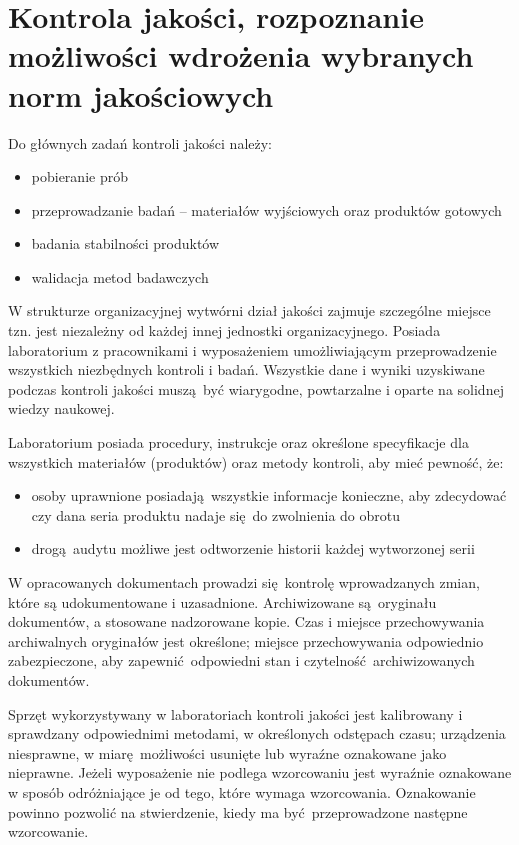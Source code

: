 \section{Kontrola jakości, rozpoznanie możliwości wdrożenia wybranych norm jakościowych}

Do głównych zadań kontroli jakości należy:
\begin{itemize}
	\item pobieranie prób
	\item przeprowadzanie badań -- materiałów wyjściowych oraz produktów gotowych
	\item badania stabilności produktów
	\item walidacja metod badawczych
\end{itemize}\vspace{\baselineskip}

W strukturze organizacyjnej wytwórni dział jakości zajmuje szczególne miejsce tzn. jest niezależny od każdej innej jednostki organizacyjnego. Posiada laboratorium z pracownikami i wyposażeniem umożliwiającym przeprowadzenie wszystkich niezbędnych kontroli i badań. Wszystkie dane i wyniki uzyskiwane podczas kontroli jakości muszą być wiarygodne, powtarzalne i oparte na solidnej wiedzy naukowej.\vspace{\baselineskip}

Laboratorium posiada procedury, instrukcje oraz określone specyfikacje dla wszystkich materiałów (produktów) oraz metody kontroli, aby mieć pewność, że:
\begin{itemize}
	\item osoby uprawnione posiadają wszystkie informacje konieczne, aby zdecydować czy dana seria produktu nadaje się do zwolnienia do obrotu
	\item drogą audytu możliwe jest odtworzenie historii każdej wytworzonej serii
\end{itemize}\vspace{\baselineskip}

W opracowanych dokumentach prowadzi się kontrolę wprowadzanych zmian, które są udokumentowane i uzasadnione. Archiwizowane są oryginału dokumentów, a stosowane nadzorowane kopie. Czas i miejsce przechowywania archiwalnych oryginałów jest określone; miejsce przechowywania odpowiednio zabezpieczone, aby zapewnić odpowiedni stan i czytelność archiwizowanych dokumentów.

Sprzęt wykorzystywany w laboratoriach kontroli jakości jest kalibrowany i sprawdzany odpowiednimi metodami, w określonych odstępach czasu; urządzenia niesprawne, w miarę możliwości usunięte lub wyraźne oznakowane jako nieprawne. Jeżeli wyposażenie nie podlega wzorcowaniu jest wyraźnie oznakowane w sposób odróżniające je od tego, które wymaga wzorcowania. Oznakowanie powinno pozwolić na stwierdzenie, kiedy ma być przeprowadzone następne wzorcowanie.

